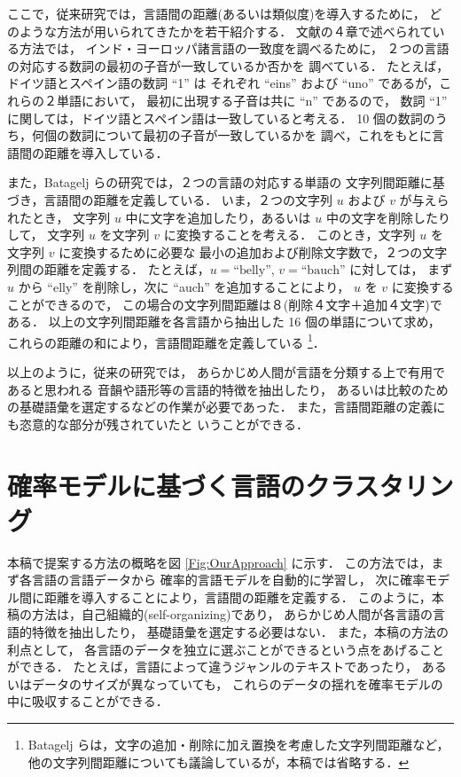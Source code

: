 ここで，従来研究では，言語間の距離(あるいは類似度)を導入するために，
どのような方法が用いられてきたかを若干紹介する．
文献\cite{Yasumoto95Book}の４章で述べられている方法では，
インド・ヨーロッパ諸言語の一致度を調べるために，
２つの言語の対応する数詞の最初の子音が一致しているか否かを
調べている．
たとえば，ドイツ語とスペイン語の数詞 ``1'' は
それぞれ ``eins'' および ``uno'' であるが，これらの２単語において，
最初に出現する子音は共に ``n'' であるので，
数詞 ``1'' に関しては，ドイツ語とスペイン語は一致していると考える．
10 個の数詞のうち，何個の数詞について最初の子音が一致しているかを
調べ，これをもとに言語間の距離を導入している．

また，Batagelj らの研究では，２つの言語の対応する単語の
文字列間距離に基づき，言語間の距離を定義している．
いま，２つの文字列 $u$ および $v$ が与えられたとき，
文字列 $u$ 中に文字を追加したり，あるいは $u$ 中の文字を削除したりして，
文字列 $u$ を文字列 $v$ に変換することを考える．
このとき，文字列 $u$ を文字列 $v$ に変換するために必要な
最小の追加および削除文字数で，２つの文字列間の距離を定義する．
たとえば，$u = \mbox{``belly''}$, $v = \mbox{``bauch''}$ に対しては，
まず $u$ から ``elly'' を削除し，次に ``auch'' を追加することにより，
$u$ を $v$ に変換することができるので，
この場合の文字列間距離は８(削除４文字＋追加４文字)である．
以上の文字列間距離を各言語から抽出した 16 個の単語について求め，
これらの距離の和により，言語間距離を定義している
\footnote
{
Batagelj らは，文字の追加・削除に加え置換を考慮した文字列間距離など，
他の文字列間距離についても議論しているが，本稿では省略する．
}．

以上のように，従来の研究では，
あらかじめ人間が言語を分類する上で有用であると思われる
音韻や語形等の言語的特徴を抽出したり，
あるいは比較のための基礎語彙を選定するなどの作業が必要であった．
また，言語間距離の定義にも恣意的な部分が残されていたと
いうことができる．

\section{確率モデルに基づく言語のクラスタリング}

本稿で提案する方法の概略を図 \ref{Fig:OurApproach} に示す．
この方法では，まず各言語の言語データから
確率的言語モデルを自動的に学習し，
次に確率モデル間に距離を導入することにより，言語間の距離を定義する．
このように，本稿の方法は，自己組織的(self-organizing)であり，
あらかじめ人間が各言語の言語的特徴を抽出したり，
基礎語彙を選定する必要はない．
また，本稿の方法の利点として，
各言語のデータを独立に選ぶことができるという点をあげることができる．
たとえば，言語によって違うジャンルのテキストであったり，
あるいはデータのサイズが異なっていても，
これらのデータの揺れを確率モデルの中に吸収することができる．

